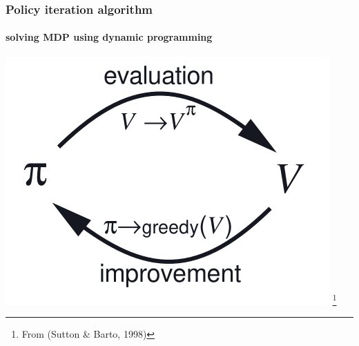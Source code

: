 \documentclass[dvipsnames,svgnames]{beamer}
\begin{document}
%


\begin{frame}
\frametitle{Policy iteration algorithm}
\framesubtitle{solving MDP using dynamic programming }
\centering
\includegraphics[scale=0.7]{img/policy_iter_sutton.PNG}
\footnote{From (Sutton \& Barto, 1998)}
\end{frame}
\end{document}
